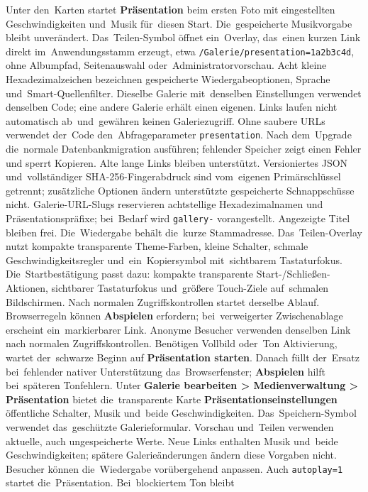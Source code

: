 \documentclass[11pt,a4paper]{article}
\newcommand{\ui}[1]{\textbf{#1}}
\newcommand{\codeword}[1]{\nolinkurl{#1}}
\begin{document}
Unter den~Karten startet \ui{Präsentation} beim ersten Foto mit
eingestellten Geschwindigkeiten und~Musik für~diesen Start. Die~gespeicherte
Musikvorgabe bleibt unverändert. Das~Teilen-Symbol öffnet ein~Overlay, das~einen
kurzen Link direkt im~Anwendungsstamm erzeugt, etwa
\codeword{/Galerie/presentation=1a2b3c4d}, ohne Albumpfad, Seitenauswahl
oder~Administratorvorschau. Acht kleine Hexadezimalzeichen
bezeichnen gespeicherte Wiedergabeoptionen, Sprache und~Smart-Quellenfilter.
Dieselbe Galerie mit~denselben Einstellungen verwendet denselben Code;
eine andere Galerie erhält einen eigenen. Links laufen nicht automatisch
ab~und~gewähren keinen Galeriezugriff. Ohne saubere URLs verwendet der~Code
den~Abfrageparameter \codeword{presentation}. Nach dem~Upgrade die~normale
Datenbankmigration ausführen; fehlender Speicher zeigt einen Fehler und
sperrt Kopieren. Alte lange Links bleiben unterstützt. Versioniertes JSON
und~vollständiger SHA-256-Fingerabdruck sind vom~eigenen Primärschlüssel
getrennt; zusätzliche Optionen ändern unterstützte gespeicherte Schnappschüsse
nicht. Galerie-URL-Slugs reservieren achtstellige Hexadezimalnamen und
Präsentationspräfixe; bei~Bedarf wird \codeword{gallery-} vorangestellt.
Angezeigte Titel bleiben frei. Die~Wiedergabe behält die~kurze Stammadresse.
Das~Teilen-Overlay nutzt kompakte transparente Theme-Farben, kleine Schalter,
schmale Geschwindigkeitsregler und~ein~Kopiersymbol mit~sichtbarem
Tastaturfokus.
Die~Startbestätigung passt dazu: kompakte transparente
Start-/Schließen-Aktionen,
sichtbarer Tastaturfokus und~größere Touch-Ziele auf~schmalen Bildschirmen.
Nach normalen Zugriffskontrollen startet
derselbe Ablauf. Browserregeln können \ui{Abspielen} erfordern;
bei~verweigerter Zwischenablage erscheint ein~markierbarer Link.
Anonyme Besucher verwenden denselben Link nach normalen Zugriffskontrollen.
Benötigen Vollbild oder~Ton Aktivierung, wartet der~schwarze Beginn auf
\ui{Präsentation starten}. Danach füllt der~Ersatz bei~fehlender nativer
Unterstützung das~Browserfenster; \ui{Abspielen} hilft bei~späteren Tonfehlern.
Unter \ui{Galerie bearbeiten > Medienverwaltung > Präsentation} bietet
die~transparente
Karte \ui{Präsentationseinstellungen} öffentliche Schalter, Musik und~beide
Geschwindigkeiten. Das~Speichern-Symbol verwendet das~geschützte
Galerieformular.
Vorschau und~Teilen verwenden aktuelle, auch ungespeicherte Werte. Neue Links
enthalten Musik und~beide Geschwindigkeiten; spätere Galerieänderungen ändern
diese Vorgaben nicht. Besucher können die~Wiedergabe vorübergehend anpassen.
Auch \codeword{autoplay=1} startet die~Präsentation. Bei~blockiertem Ton bleibt
\end{document}
